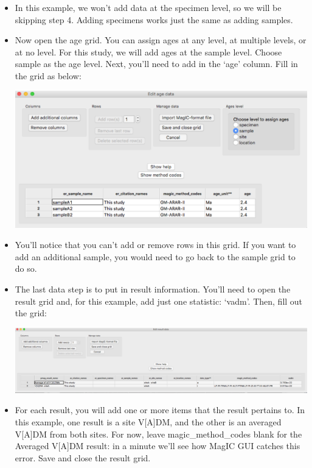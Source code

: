 \documentclass[11pt]{book}
\begin{document}
{\begin{itemize}
    \texttt{[image: EPSfiles/MM\_sample\_grid\_propagated\_full.eps]}

  \item In this example, we won't add data at the specimen level, so we will be skipping step 4.  Adding specimens works just the same as adding samples.

  \item Now open the age grid.  You can assign ages at any level, at multiple levels, or at no level.  For this study, we will add ages at the sample level.  Choose sample as the age level.  Next, you'll need to add in the `age' column.  Fill in the grid as below:

    \includegraphics[width=25cm]{EPSfiles/MM_age_grid.eps}

  \item You'll notice that you can't add or remove rows in this grid.  If you want to add an additional sample, you would need to go back to the sample grid to do so.

  \item The last data step is to put in result information.  You'll need to open the result grid and, for this example, add just one statistic: `vadm'.  Then, fill out the grid:

    \includegraphics[width=45cm]{EPSfiles/MM_result_grid.eps}

  \item For each result, you will add one or more items that the result pertains to.  In this example, one result is a site V[A]DM, and the other is an averaged V[A]DM from both sites.  For now, leave magic\_method\_codes blank for the Averaged V[A]DM result: in a minute we'll see how MagIC GUI catches this error.  Save and close the result grid.


\end{itemize}}
\end{document}
